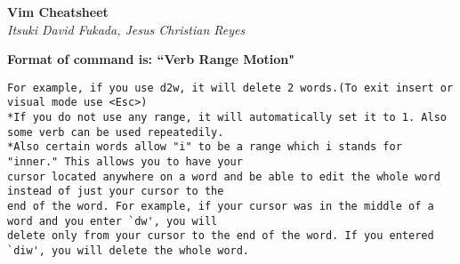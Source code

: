 \documentclass{article}
\begin{document}
\begin{center}
\LARGE\textbf{Vim Cheatsheet}\\
\textit{Itsuki David Fukada, Jesus Christian Reyes}
\end{center}

\begin{framed}
\begin{center}
\Large\textbf{Format of command is: ``Verb Range Motion"}
\end{center}
\normalsize\begin{verbatim}
For example, if you use d2w, it will delete 2 words.(To exit insert or visual mode use <Esc>)
*If you do not use any range, it will automatically set it to 1. Also some verb can be used repeatedily.
*Also certain words allow "i" to be a range which i stands for "inner." This allows you to have your
cursor located anywhere on a word and be able to edit the whole word instead of just your cursor to the
end of the word. For example, if your cursor was in the middle of a word and you enter `dw', you will
delete only from your cursor to the end of the word. If you entered `diw', you will delete the whole word.
\end{verbatim}
\end{framed}
\end{document}
